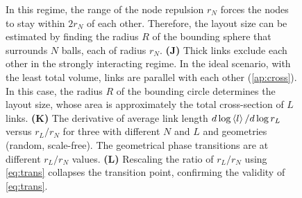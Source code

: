 \documentclass[endfloats,nofootinbib,preprint,floatfix,titlepage,superscriptaddress,linenumbers]{revtex4-1} %
\begin{document}
{\begin{figure}
{{    In this regime, the range of the node repulsion $r_N$ forces the nodes to stay within $2r_N$ of each other. 
    Therefore, the layout size can be estimated by finding the radius $R$ of the bounding sphere that surrounds $N$ balls, each of radius $r_N$. 
    {\bf (J)} Thick links exclude each other  in the strongly interacting regime. 
    In the ideal scenario, with the least total volume, links are parallel with each other (\ref{ap:cross}). 
    In this case, the radius $R$ of the bounding circle determines the layout size, whose area is approximately the total cross-section of $L$ links. 
    {\bf (K)} The derivative of average link length $d\log\left<l\right>/d\log r_L$ versus $r_L/r_N$ for three with different $N$ and $L$ and geometries (random, scale-free). 
    The geometrical phase transitions are at different $r_L/r_N$ values. 
    {\bf (L)} Rescaling the ratio of $r_L/r_N$ using \eqref{eq:trans}  collapses the transition point, %
    confirming the validity of \eqref{eq:trans}.
    }%
    \vspace{-2cm}
          }   
    \label{fig:phase-compare}
\end{figure}
}%
\end{document}
